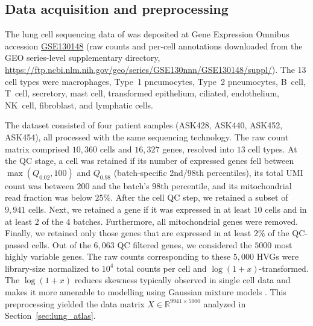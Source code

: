 \documentclass[10pt]{article}
\newcommand{\R}{\mathbb R}
\begin{document}
\subsection{Data acquisition and preprocessing}
\label{sec:data_preprocess}
The lung cell sequencing data of
\citet{Vieira_Braga2019-nl} was deposited at Gene Expression Omnibus
accession
\href{https://www.ncbi.nlm.nih.gov/geo/query/acc.cgi?acc=GSE130148}{GSE130148}
(raw counts and per-cell annotations downloaded from the GEO
series-level supplementary directory,
\url{https://ftp.ncbi.nlm.nih.gov/geo/series/GSE130nnn/GSE130148/suppl/}). The 13 cell types were 
macrophages, Type~1 pneumocytes, Type~2 pneumocytes, B~cell, T~cell, secretory, mast cell, transformed epithelium, ciliated, endothelium, NK~cell, fibroblast, and lymphatic cells. 

The dataset consisted of four patient samples (ASK428, ASK440, ASK452, ASK454), all processed with the same sequencing technology. 
The raw count matrix comprised $10{,}360$ cells and $16{,}327$ genes, resolved into $13$ cell types. At the QC stage, a cell was retained if
its number of expressed genes fell between $\max(Q_{0.02},100)$ and $Q_{0.98}$ (batch-specific 2nd/98th percentiles), its total UMI count was between $200$ and the batch's 98th percentile, and its mitochondrial read fraction was below $25\%$. After the cell QC step, we retained a subset of $9{,}941$ cells. Next, we retained a gene if it was expressed in at least $10$ cells and in at least $2$ of the $4$ batches. Furthermore, all mitochondrial genes were removed. Finally, we retained only those genes that are expressed in at least $2\%$ of the QC-passed cells. Out of the $6{,}063$ QC filtered genes, we considered the $5000$ most highly variable genes. The raw counts corresponding to these $5{,}000$ HVGs were library-size normalized to $10^{4}$ total counts per cell and $\log(1+x)$-transformed. The $\log(1+x)$ reduces skewness typically observed in single cell data and makes it more amenable to modelling using Gaussian mixture models \citep{zhong2022empirical,cao2025modah}. This preprocessing yielded the data matrix $X \in \R^{9941 \times 5000}$ analyzed in Section~\ref{sec:lung_atlas}.
\end{document}
